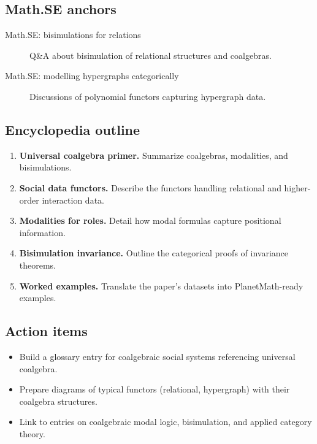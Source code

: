 \subsection*{Math.SE anchors}
\begin{description}
  \item[Math.SE: bisimulations for relations] Q\&A about bisimulation of relational structures and coalgebras.
  \item[Math.SE: modelling hypergraphs categorically] Discussions of polynomial functors capturing hypergraph data.
\end{description}
\subsection*{Encyclopedia outline}
\begin{enumerate}
  \item \textbf{Universal coalgebra primer.} Summarize coalgebras, modalities, and bisimulations.
  \item \textbf{Social data functors.} Describe the functors handling relational and higher-order interaction data.
  \item \textbf{Modalities for roles.} Detail how modal formulas capture positional information.
  \item \textbf{Bisimulation invariance.} Outline the categorical proofs of invariance theorems.
  \item \textbf{Worked examples.} Translate the paper's datasets into PlanetMath-ready examples.
\end{enumerate}
\subsection*{Action items}
\begin{itemize}
  \item Build a glossary entry for coalgebraic social systems referencing universal coalgebra.
  \item Prepare diagrams of typical functors (relational, hypergraph) with their coalgebra structures.
  \item Link to entries on coalgebraic modal logic, bisimulation, and applied category theory.
\end{itemize}
